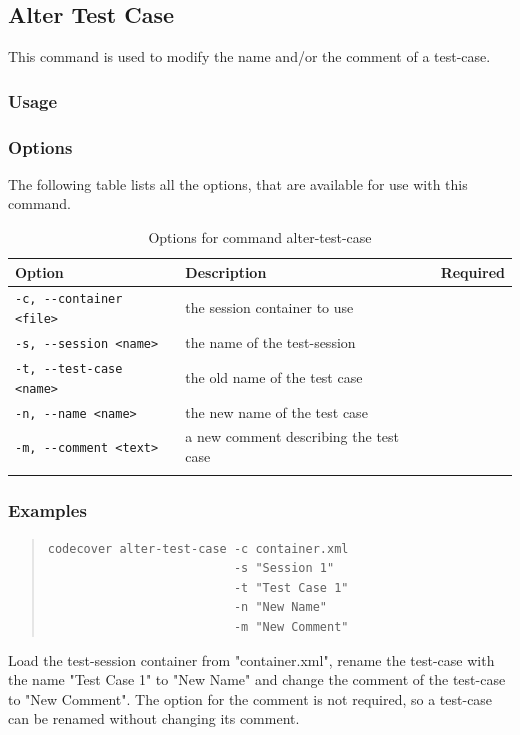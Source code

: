 \subsection{Alter Test Case}\label{Command-Alter-Test-Case}
This command is used to modify the name and/or the comment of a test-case.
\subsubsection{Usage}\label{command:at:usage}
\begin{quote}
\end{quote}

\subsubsection{Options}\label{command:at:options}
The following table lists all the options, that are available for use with this command.
\begin{longtable}{|l|p{4cm}|c|}\hline
   {\textbf{Option}} & 
   {\textbf{Description}} & 
   {\textbf{Required}} \\\hline \hline \endhead
   \verb$-c, --container <file>$ & the session container to use & \x \\\hline
   \verb$-s, --session <name>$ & the name of the test-session & \x \\\hline
   \verb$-t, --test-case <name>$ & the old name of the test case & \x \\\hline
   \verb$-n, --name <name>$ & the new name of the test case & \\\hline
   \verb$-m, --comment <text>$ & a new comment describing the test case & \\\hline
  \caption{Options for command alter-test-case}
  \label{fr_tb:Options for command alter-test-case}
\end{longtable}

\subsubsection{Examples}\label{command:at:examples}
\begin{quote}
\begin{verbatim}
codecover alter-test-case -c container.xml 
                          -s "Session 1"
                          -t "Test Case 1" 
                          -n "New Name" 
                          -m "New Comment"
\end{verbatim}
\end{quote}
Load the test-session container from "container.xml", rename the test-case with the name "Test Case 1" to "New Name" and change the comment of the test-case to "New Comment". The option for the comment is not required, so a test-case can be renamed without changing its comment.

